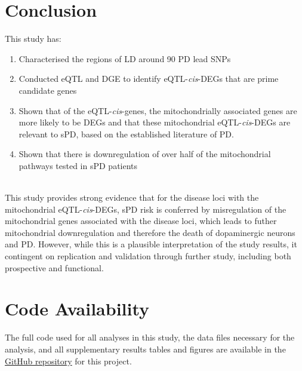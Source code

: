 \documentclass{article}
\begin{document}
\section{Conclusion}
This study has:
\begin{enumerate}
    \item Characterised the regions of LD around 90 PD lead SNPs
    \item Conducted eQTL and DGE to identify eQTL-\textit{cis}-DEGs that are prime candidate genes
    \item Shown that of the eQTL-\textit{cis}-genes, the mitochondrially associated genes are more likely to be DEGs and that these mitochondrial eQTL-\textit{cis}-DEGs are relevant to sPD, based on the established literature of PD.
    \item Shown that there is downregulation of over half of the mitochondrial pathways tested in sPD patients
\end{enumerate}
\\This study provides strong evidence that for the disease loci with the mitochondrial eQTL-\textit{cis}-DEGs, sPD risk is conferred by misregulation of the mitochondrial genes associated with the disease loci, which leads to futher mitochondrial downregulation and therefore the death of dopaminergic neurons and PD. However, while this is a plausible interpretation of the study results, it contingent on replication and validation through further study, including both prospective and functional.
\newpage
\section{Code Availability}
The full code used for all analyses in this study, the data files necessary for the analysis, and all supplementary results tables and figures are available in the \href{https://github.com/Thomas-brightwell/PD-MSc-project-code/tree/main}{GitHub repository} for this project.
\newpage
\begin{singlespace}
\printbibliography
\end{singlespace}
\end{document}
